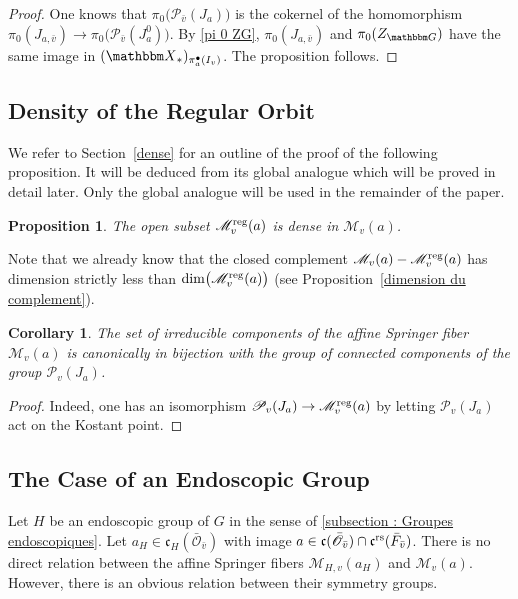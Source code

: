 \documentclass[12pt,english]{smfart}
\numberwithin{equation}{subsection}
\newtheorem{proposition}[equation]{Proposition}
\newtheorem{corollary}[equation]{Corollary}
\theoremstyle{remark}
\newcommand\calP{{\mathscr P}}
\newcommand\calM{{\mathscr M}}
\newcommand\calO{{\mathscr O}}
\newcommand\frakc{{\mathfrak c}}
\newcommand\GG{{\mathbbm G}}
\newcommand\bbX{{\mathbbm X}}
\newcommand\rs{{\rm rs}}
\newcommand\reg{{\rm reg}}
\begin{document}
\begin{proof}
One knows that $\pi_0\bigl(\calP_{\bar v}(J_a)\bigr)$ is the cokernel of the homomorphism $\pi_0(J_{a,\bar v}) \to \pi_0\bigl(\calP_{\bar v}(J_a^0)\bigr)$. By \ref{pi 0 ZG}, $\pi_0(J_{a,\bar v})$ and $\pi_0(Z_{\GG})$ have the same image in $(\bbX_*)_{\pi_a^\bullet(I_v)}$. The proposition follows.
\end{proof}

\subsection{Density of the Regular Orbit}
We refer to Section~\ref{dense} for an outline of the proof of the following proposition. It will be deduced from its global analogue which will be proved in detail later. Only the global analogue will be used in the remainder of the paper.

\begin{proposition}\label{densite locale}
The open subset $\calM_v^\reg(a)$ is dense in $\calM_v(a)$.
\end{proposition}

Note that we already know that the closed complement $\calM_v(a)-\calM_v^\reg(a)$ has dimension strictly less than $\dim\bigl(\calM_v^\reg(a)\bigr)$ (see Proposition~\ref{dimension du complement}).

\begin{corollary}
The set of irreducible components of the affine Springer fiber $\calM_v(a)$ is canonically in bijection with the group of connected components of the group $\calP_v(J_a)$.
\end{corollary}

\begin{proof}
Indeed, one has an isomorphism $\calP_v(J_a)\to \calM_v^\reg(a)$ by letting $\calP_v(J_a)$ act on the Kostant point.
\end{proof}

\subsection{The Case of an Endoscopic Group}

Let $H$ be an endoscopic group of $G$ in the sense of \ref{subsection : Groupes endoscopiques}. Let $a_H\in\frakc_H(\bar{\calO}_{\bar v})$ with image $a\in\frakc(\bar{\calO}_{\bar v})\cap \frakc^\rs(\bar F_{\bar v})$. There is no direct relation between the affine Springer fibers $\calM_{H,v}(a_H)$ and $\calM_v(a)$. However, there is an obvious relation between their symmetry groups.
\end{document}
